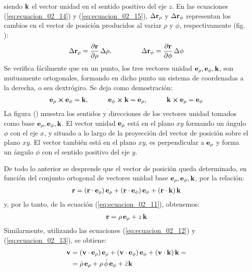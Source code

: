 \documentclass[12pt]{article}
\begin{document}
siendo $\vb{k}$ el vector unidad en el sentido positivo del eje $z$. En las ecuaciones (\ref{eq:ecuacion_02_14}) y (\ref{eq:ecuacion_02_15}), $\Delta \vb{r}_{\rho}$ y $\Delta \vb{r}_{\phi}$ representan los cambios en el vector de posición producidos al variar $\rho$ y $\phi$, respectivamente (fig. ):
\begin{align*}
\Delta \vb{r}_{\rho} = \pdv{\vb{r}}{\rho} \, \Delta \rho, \hspace{1.5cm} \Delta \vb{r}_{\phi} = \pdv{\vb{r}}{\phi} \, \Delta \phi
\end{align*} 
Se verifica fácilmente que en un punto, los tres vectores unidad $\vb{e}_{\rho}, \vb{e}_{\phi}, \vb{k}$, son mutuamente ortogonales, formando en dicho punto un sistema de coordenadas a la derecha, o sea dextrógiro. Se deja como demostración:
\begin{align}
\vb{e}_{\rho} \cp \vb{e}_{\phi} = \vb{k}, \hspace{1cm} \vb{e}_{\phi} \cp \vb{k} = \vb{e}_{\rho}, \hspace{1cm} \vb{k} \cp \vb{e}_{\rho} = \vb{e}_{\phi}
\label{eq:ecuacion_02_16}
\end{align}
La figura () muestra los sentidos y direcciones de los vectores unidad tomados como base $\vb{e}_{\rho}, \vb{e}_{\phi}, \vb{k}$. El vector unidad $\vb{e}_{\rho}$ está en el plano $x y$ formando un ángulo $\phi$ con el eje $x$, y situado a lo largo de la proyección del vector de posición sobre el plano $x y$. El vector también está en el plano $x y$, es perpendicular a $\vb{e}_{\rho}$ y forma un ángulo $\phi$ con el sentido positivo del eje $y$. 
\par
De todo lo anterior se desprende que el vector de posición queda determinado, en función del conjunto ortogonal de vectores unidad base $\vb{e}_{\rho}, \vb{e}_{\phi}, \vb{k}$, por la relación:
\begin{align*}
\vb{r} = \left( \vb{r} \cdot \vb{e}_{\rho} \right) \vb{e}_{\rho} + \left( \vb{r} \cdot \vb{e}_{\phi} \right) \vb{e}_{\phi} + \left( \vb{r} \cdot \vb{k} \right) \vb{k}
\end{align*}
y, por lo tanto, de la ecuación (\ref{eq:ecuacion_02_11}), obtenemos:
\begin{align}
\vb{r} = \rho \, \vb{e}_{\rho} +  z \, \vb{k}
\label{eq:ecuacion_02_17}
\end{align}
Similarmente, utilizando las ecuaciones (\ref{eq:ecuacion_02_12}) y (\ref{eq:ecuacion_02_13}), se obtiene:
\begin{align}
\begin{aligned}
\vb{v} &= \left( \vb{v} \cdot \vb{e}_{\rho} \right) \vb{e}_{\rho} + \left( \vb{v} \cdot \vb{e}_{\phi} \right) \vb{e}_{\phi} + \left( \vb{v} \cdot \vb{k} \right) \vb{k} = \\
&= \dot{\rho} \, \vb{e}_{\rho} + \rho \, \dot{\phi} \, \vb{e}_{\phi} + \dot{z} \vb{k}
\end{aligned}
\label{eq:ecuacion_02_18}
\end{align}
\end{document}

